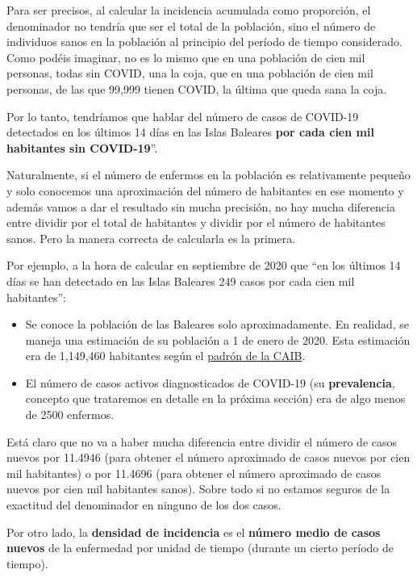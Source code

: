 \documentclass[
]{book}
\theoremstyle{definition}
\theoremstyle{definition}
\theoremstyle{definition}
\theoremstyle{definition}
\theoremstyle{remark}
\begin{document}
\begin{rmderror}
Para ser precisos, al calcular la incidencia acumulada como proporción, el denominador no tendría que ser el total de la población, sino el número de individuos sanos en la población al principio del período de tiempo considerado. Como podéis imaginar, no es lo mismo que en una población de cien mil personas, todas sin COVID, una la coja, que en una población de cien mil personas, de las que 99,999 tienen COVID, la última que queda sana la coja.

Por lo tanto, tendríamos que hablar del número de casos de COVID-19 detectados en los últimos 14 días en las Islas Baleares \textbf{por cada cien mil habitantes sin COVID-19}''.
\end{rmderror}

Naturalmente, si el número de enfermos en la población es relativamente pequeño y solo conocemos una aproximación del número de habitantes en ese momento y además vamos a dar el resultado sin mucha precisión, no hay mucha diferencia entre dividir por el total de habitantes y dividir por el número de habitantes sanos. Pero la manera correcta de calcularla es la primera.

Por ejemplo, a la hora de calcular en septiembre de 2020 que ``en los últimos 14 días se han detectado en las Islas Baleares 249 casos por cada cien mil habitantes'':

\begin{itemize}
\item
  Se conoce la población de las Baleares solo aproximadamente. En realidad, se maneja una estimación de su población a 1 de enero de 2020. Esta estimación era de 1,149,460 habitantes según el \href{https://www.caib.es/ibestat/estadistiques/poblacio/padro/2acef6cf-175a-4826-b71e-8302b13c1262}{padrón de la CAIB}.
\item
  El número de casos activos diagnosticados de COVID-19 (su \textbf{prevalencia}, concepto que trataremos en detalle en la próxima sección) era de algo menos de 2500 enfermos.
\end{itemize}

Está claro que no va a haber mucha diferencia entre dividir el número de casos nuevos por 11.4946 (para obtener el número aproximado de casos nuevos por cien mil habitantes) o por 11.4696 (para obtener el número aproximado de casos nuevos por cien mil habitantes sanos). Sobre todo si no estamos seguros de la exactitud del denominador en ninguno de los dos casos.

Por otro lado, la \textbf{densidad de incidencia} es el \textbf{número medio de casos nuevos} de la enfermedad por unidad de tiempo (durante un cierto período de tiempo).
\end{document}
